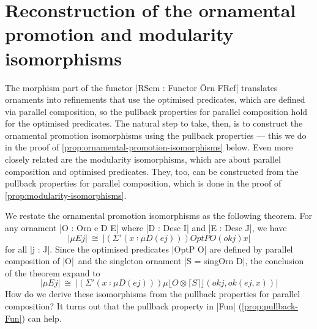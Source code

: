 \section{Reconstruction of the ornamental promotion and modularity isomorphisms}
\label{sec:isomorphisms}

The morphism part of the functor |RSem : Functor Ōrn FRef| translates ornaments into refinements that use the optimised predicates, which are defined via parallel composition, so the pullback properties for parallel composition hold for the optimised predicates.
The natural step to take, then, is to construct the ornamental promotion isomorphisms using the pullback properties --- this we do in the proof of \autoref{prop:ornamental-promotion-isomorphisms} below.
Even more closely related are the modularity isomorphisms, which are about parallel composition and optimised predicates.
They, too, can be constructed from the pullback properties for parallel composition, which is done in the proof of \autoref{prop:modularity-isomorphisms}.

We restate the ornamental promotion isomorphisms as the following theorem.
For any ornament |O : Orn e D E| where |D : Desc I| and |E : Desc J|, we have
\[ |μ E j| ~\cong~ |(Σ'(x ∶ μ D (e j))) OptP O (ok j) x| \]
for all |j : J|.
Since the optimised predicates |OptP O| are defined by parallel composition of |O|~and the singleton ornament |S = singOrn D|, the conclusion of the theorem expand to
\begin{equation}
|μ E j| ~\cong~ |(Σ'(x ∶ μ D (e j))) μ ⌊ O ⊗ ⌈ S ⌉ ⌋ (ok j , ok (e j , x))|
\label{eq:rep-iso}
\end{equation}
How do we derive these isomorphisms from the pullback properties for parallel composition?
It turns out that the pullback property in |Fun| (\autoref{prop:pullback-Fun}) can help.

